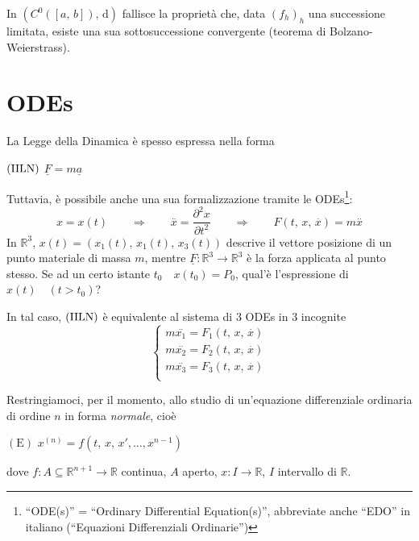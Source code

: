 \begin{obs} In $\left( C^0([a,\,b]),\,\mathrm{d} \right)$ fallisce la proprietà che, data $(f_h)_h$ una successione limitata, esiste una sua sottosuccessione convergente (teorema di Bolzano-Weierstrass).
\end{obs}



\section{ODEs}
\begin{example}
La  Legge della Dinamica è spesso espressa nella forma
\begin{center}
$\mathrm{(\RNum{2}LN)}$
\hfill
$\displaystyle
\underline{F} = m \underline{a}
$
\hfill \null \\
\end{center}
Tuttavia, è possibile anche una sua formalizzazione tramite le ODEs\footnote{``ODE(s)'' = ``Ordinary Differential Equation(s)'', abbreviate anche ``EDO'' in italiano (``Equazioni Differenziali Ordinarie'')}:
$$
x = x(t) \qquad\Longrightarrow\qquad \overset{..}{x} = \frac{\partial^2 x}{\partial t^2}
\qquad\Longrightarrow\qquad F(t,\,x,\,\overset{.}{x}) = m \overset{..}{x}
$$
In $\mathbb{R}^3$, $x(t) = (x_1(t),\,x_1(t),\,x_3(t))$ descrive il vettore posizione di un punto materiale di massa $m$, mentre $\underline{F} : \mathbb{R}^3 \longrightarrow \mathbb{R}^3$ è la forza applicata al punto stesso. Se ad un certo istante $t_0 \quad x(t_0) = P_0$, qual'è l'espressione di $x(t) \quad (t>t_0)$?

In tal caso, $\mathrm{(\RNum{2}LN)}$ è equivalente al sistema di $3$ ODEs in $3$ incognite
$$
\begin{cases}
m \overset{..}{x_1} = F_1(t,\,x,\,\overset{.}{x})\\
m \overset{..}{x_2} = F_2(t,\,x,\,\overset{.}{x})\\
m \overset{..}{x_3} = F_3(t,\,x,\,\overset{.}{x})\\
\end{cases}
$$
\end{example}

Restringiamoci, per il momento, allo studio di un'equazione differenziale ordinaria di ordine $n$ in forma \emph{normale}, cioè
\begin{center}
$\mathrm{(E)}$
\hfill
$\displaystyle
x^{(n)} = f \left( t,\,x,\,x',\ldots,x^{n-1} \right)
$
\hfill \null \\
\end{center}
dove $f : A \subseteq \mathbb{R}^{n+1} \longrightarrow \mathbb{R}$ continua, $A$ aperto, $x : I \longrightarrow \mathbb{R}$, $I$ intervallo di $\mathbb{R}$.

